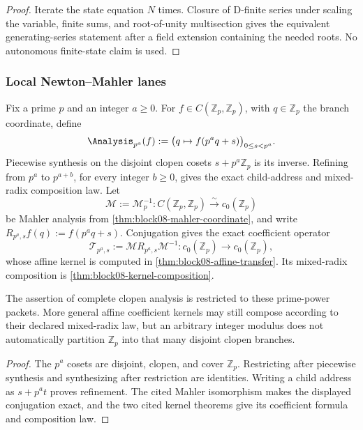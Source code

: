 \begin{proof}
Iterate the state equation \(N\) times.  Closure of D-finite series under
scaling the variable, finite sums, and root-of-unity multisection gives the
equivalent generating-series statement after a field extension containing the
needed roots.  No autonomous finite-state claim is used.
\end{proof}

\subsubsection{Local Newton--Mahler lanes}

\begin{proposition}
\label{prop:block15-local-specialization}
Fix a prime \(p\) and an integer \(a\ge0\).  For
\(f\in C(\mathbb Z_p,\mathbb Z_p)\), with \(q\in\mathbb Z_p\) the branch
coordinate, define
\[
 \Analysis_{p^a}(f)
 :=
 \bigl(q\mapsto f(p^aq+s)\bigr)_{0\le s<p^a}.
\]
Piecewise synthesis on the disjoint clopen cosets
\(s+p^a\mathbb Z_p\) is its inverse.  Refining from \(p^a\) to
\(p^{a+b}\), for every integer \(b\ge0\), gives the exact child-address and
mixed-radix composition law.
Let
\[
 \mathcal M:=\mathcal M_p^{-1}:C(\mathbb Z_p,\mathbb Z_p)
 \xrightarrow{\sim}c_0(\mathbb Z_p)
\]
be Mahler analysis from \cref{thm:block08-mahler-coordinate}, and write
\(R_{p^a,s}f(q):=f(p^aq+s)\).  Conjugation gives the exact coefficient
operator
\[
 \mathcal T_{p^a,s}
 :=\mathcal M R_{p^a,s}\mathcal M^{-1}:
 c_0(\mathbb Z_p)\longrightarrow c_0(\mathbb Z_p),
\]
whose affine kernel is computed in \cref{thm:block08-affine-transfer}.  Its
mixed-radix composition is \cref{thm:block08-kernel-composition}.

The assertion of complete clopen analysis is restricted to these
prime-power packets.  More general affine coefficient kernels may still
compose according to their declared mixed-radix law, but an arbitrary integer
modulus does not automatically partition \(\mathbb Z_p\) into that many
disjoint clopen branches.
\end{proposition}

\begin{proof}
The \(p^a\) cosets are disjoint, clopen, and cover \(\mathbb Z_p\).  Restricting
after piecewise synthesis and synthesizing after restriction are identities.
Writing a child address as \(s+p^at\) proves refinement.  The cited Mahler
isomorphism makes the displayed conjugation exact, and the two cited kernel
theorems give its coefficient formula and composition law.
\end{proof}

